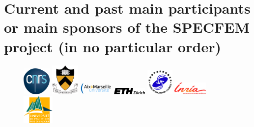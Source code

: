 \section*{Current and past main participants or main sponsors of the SPECFEM project (in no particular order)}
%
\begin{figure}[htbp]
\noindent \begin{centering}
\includegraphics[width=0.125\textwidth]{figures/logo_cnrs.png}\vspace*{2truemm}
\includegraphics[width=0.125\textwidth]{figures/logo_princeton.jpg}\vspace*{2truemm}
\includegraphics[width=0.15\textwidth]{figures/logo_aix_marseille_universite.png}\vspace*{0.02truemm}
\includegraphics[width=0.15\textwidth]{figures/logo_ETH.jpg}\vspace*{2truemm}
\includegraphics[width=0.12\textwidth]{figures/logo_CSC_China.jpg}\vspace*{0.02truemm}
\includegraphics[width=0.15\textwidth]{figures/logo_inria.jpg}\vspace*{2truemm}
\includegraphics[width=0.14\textwidth]{figures/logo_UPPA.png}

\end{centering}
\end{figure}
